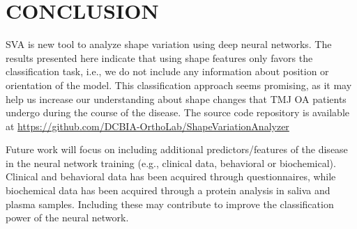 \documentclass[]{spie}  %
\begin{document}

\section{CONCLUSION}

SVA is new tool to analyze shape variation using deep neural networks. 
The results presented here indicate that using shape features only favors the classification task, i.e., 
we do not include any information about position or orientation of the model. 
This classification approach seems promising, as it may help us increase our understanding about 
shape changes that TMJ OA patients undergo during the course of the disease. 
The source code repository is available at \url{https://github.com/DCBIA-OrthoLab/ShapeVariationAnalyzer}

Future work will focus on including additional predictors/features of the disease in
the neural network training (e.g., clinical data, behavioral or biochemical). 
Clinical and behavioral data has been acquired through questionnaires, while biochemical 
data has been acquired through a protein analysis in saliva and plasma samples.
Including these may contribute to improve the classification power of the neural network.


\end{document}
